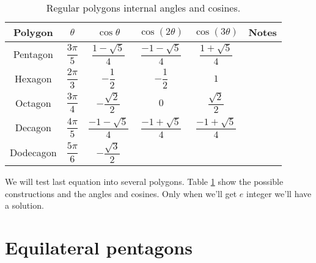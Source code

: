 \documentclass[11pt]{article}
\begin{document}
\begin{table}[h]
\centering
\begin{tabular}{|c c c c c c|}\hline
Polygon & $\theta$ & $\cos\theta$ & $\cos(2\theta)$ & $\cos(3\theta)$ & Notes 
 \rule[-2ex]{0pt}{6ex}\\ \hline\hline 
Pentagon & $\dfrac{3\pi}{5}$ &
 $\dfrac{1-\sqrt{5}}{4}$ & $\dfrac{-1-\sqrt{5}}{4}$ & $\dfrac{1+\sqrt{5}}{4}$ & 
 \rule[-2ex]{0pt}{6ex}\\ \hline
Hexagon & $\dfrac{2\pi}{3}$ &
 $-\dfrac{1}{2}$ & $-\dfrac{1}{2}$ & $1$ & 
 \rule[-2ex]{0pt}{6ex}\\ \hline
Octagon & $\dfrac{3\pi}{4}$ &
 $-\dfrac{\sqrt{2}}{2}$ & $0$ & $\dfrac{\sqrt{2}}{2}$ & 
 \rule[-2ex]{0pt}{6ex}\\ \hline
Decagon & $\dfrac{4\pi}{5}$ &
 $\dfrac{-1-\sqrt{5}}{4}$ & $\dfrac{-1+\sqrt{5}}{4}$ & $\dfrac{-1+\sqrt{5}}{4}$ &
 \rule[-2ex]{0pt}{6ex}\\ \hline
Dodecagon & $\dfrac{5\pi}{6}$ &
 $-\dfrac{\sqrt{3}}{2}$ &  &  &
 \rule[-2ex]{0pt}{6ex}\\ \hline

\end{tabular}
\caption{Regular polygons internal angles and cosines.}
\label{tbl:polygons}
\end{table}

We will test last equation into several polygons. Table \ref{tbl:polygons}
show the possible constructions and the angles and cosines.
Only when we'll get $e$ integer we'll have a solution.

\section{Equilateral pentagons}
\end{document}
